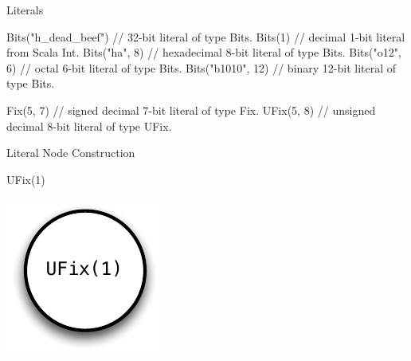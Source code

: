 \documentclass[xcolor=pdflatex,dvipsnames,table]{beamer}
\begin{document}
\begin{frame}[fragile]{Literals}
\begin{scala}
Bits("h_dead_beef") // 32-bit literal of type Bits.
Bits(1)             // decimal 1-bit literal from Scala Int.
Bits("ha", 8)       // hexadecimal 8-bit literal of type Bits.
Bits("o12", 6)      // octal 6-bit literal of type Bits.
Bits("b1010", 12)   // binary 12-bit literal of type Bits.

Fix(5, 7)           // signed decimal 7-bit literal of type Fix.
UFix(5, 8)          // unsigned decimal 8-bit literal of type UFix.
\end{scala}
\end{frame}

\begin{frame}[fragile]{Literal Node Construction}

\begin{scala}
UFix(1)
\end{scala}

\begin{center}
\includegraphics[height=0.7\textheight]{figs/ufix.pdf} 
\end{center}

\end{frame}
\end{document}
